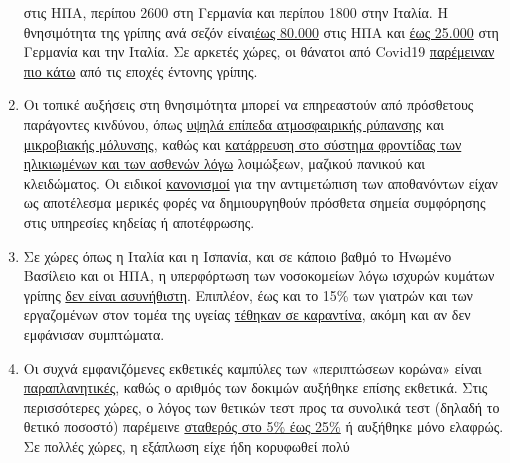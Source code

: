 \begin{enumerate}
  στις ΗΠΑ, περίπου 2600 στη Γερμανία και περίπου 1800 στην Ιταλία. Η
  θνησιμότητα της γρίπης ανά σεζόν
  είναι\href{https://www.statnews.com/2018/09/26/cdc-us-flu-deaths-winter/}{έως
  80.000} στις ΗΠΑ και
  \href{https://www.sciencedirect.com/science/article/pii/S1201971219303285}{έως
  25.000} στη Γερμανία και την Ιταλία. Σε αρκετές χώρες, οι θάνατοι από
  Covid19 \href{https://www.euromomo.eu/graphs-and-maps/}{παρέμειναν πιο
  κάτω} από τις εποχές έντονης γρίπης.
\item
  Οι τοπικέ αυξήσεις στη θνησιμότητα μπορεί να επηρεαστούν από
  πρόσθετους παράγοντες κινδύνου, όπως
  \href{https://www.theguardian.com/environment/2020/apr/20/air-pollution-may-be-key-contributor-to-covid-19-deaths-study?utm_medium}{υψηλά
  επίπεδα ατμοσφαιρικής ρύπανσης} και
  \href{https://www.ansa.it/english/news/science_tecnology/2019/11/19/italy-top-in-eu-in-antibiotic-resistance_369e0123-0107-445e-8c17-f11932c9d27c.html}{μικροβιακής
  μόλυνσης}, καθώς και
  \href{https://swprs.org/covid-19-a-report-from-italy/}{κατάρρευση στο
  σύστημα φροντίδας των ηλικιωμένων και των ασθενών λόγω} λοιμώξεων,
  μαζικού πανικού και κλειδώματος. Οι ειδικοί
  \href{https://www.ecdc.europa.eu/sites/default/files/documents/COVID-19-safe-handling-of-bodies-or-persons-dying-from-COVID19.pdf}{κανονισμοί}
  για την αντιμετώπιση των αποθανόντων είχαν ως αποτέλεσμα μερικές φορές
  να δημιουργηθούν πρόσθετα σημεία συμφόρησης στις υπηρεσίες κηδείας ή
  αποτέφρωσης.
\item
  Σε χώρες όπως η Ιταλία και η Ισπανία, και σε κάποιο βαθμό το Ηνωμένο
  Βασίλειο και οι ΗΠΑ, η υπερφόρτωση των νοσοκομείων λόγω ισχυρών
  κυμάτων γρίπης
  \href{https://off-guardian.org/2020/04/02/coronavirus-fact-check-1-flu-doesnt-overwhelm-our-hospitals/}{δεν
  είναι ασυνήθιστη}. Επιπλέον, έως και το 15\% των γιατρών και των
  εργαζομένων στον τομέα της υγείας
  \href{https://www.reuters.com/article/us-health-coronavirus-spain-morgue-idUSKBN21B1PP}{τέθηκαν
  σε καραντίνα}, ακόμη και αν δεν εμφάνισαν συμπτώματα.
\item
  Οι συχνά εμφανιζόμενες εκθετικές καμπύλες των «περιπτώσεων κορώνα»
  είναι
  \href{https://fivethirtyeight.com/features/coronavirus-case-counts-are-meaningless/}{παραπλανητικές},
  καθώς ο αριθμός των δοκιμών αυξήθηκε επίσης εκθετικά. Στις
  περισσότερες χώρες, ο λόγος των θετικών τεστ προς τα συνολικά τεστ
  (δηλαδή το θετικό ποσοστό) παρέμεινε
  \href{https://swprs.org/rate-of-positive-covid19-tests/}{σταθερός στο
  5\% έως 25\%} ή αυξήθηκε μόνο ελαφρώς. Σε πολλές χώρες, η εξάπλωση
  είχε ήδη κορυφωθεί πολύ

\end{enumerate}
